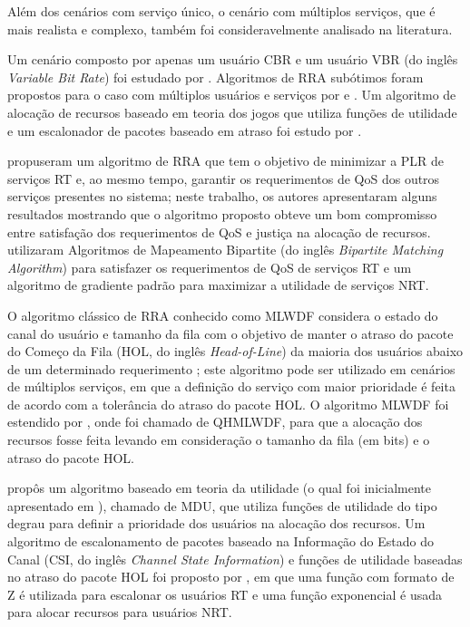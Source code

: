 Além dos cenários com serviço único, o cenário com múltiplos serviços, que é mais realista e complexo, também foi consideravelmente analisado na literatura. 

Um cenário composto por apenas um usuário CBR e um usuário VBR (do inglês \textit{Variable Bit Rate}) foi estudado por . Algoritmos de RRA subótimos foram propostos para o caso com múltiplos usuários e serviços por  e . Um algoritmo de alocação de recursos baseado em teoria dos jogos que utiliza funções de utilidade e um escalonador de pacotes baseado em atraso foi estudo por .

 propuseram um algoritmo de RRA que tem o objetivo de minimizar a PLR de serviços RT e, ao mesmo tempo, garantir os requerimentos de QoS dos outros serviços presentes no sistema; neste trabalho, os autores apresentaram alguns resultados mostrando que o algoritmo proposto obteve um bom compromisso entre satisfação dos requerimentos de QoS e justiça na alocação de recursos.  utilizaram Algoritmos de Mapeamento Bipartite (do inglês \textit{Bipartite Matching Algorithm}) para satisfazer os requerimentos de QoS de serviços RT e um algoritmo de gradiente padrão para maximizar a utilidade de serviços NRT. 

O algoritmo clássico de RRA conhecido como \ac{MLWDF} considera o estado do canal do usuário e tamanho da fila com o objetivo de manter o atraso do pacote do Começo da Fila (HOL, do inglês \textit{Head-of-Line}) da maioria dos usuários abaixo de um determinado requerimento \cite{Art:Andrews2001}; este algoritmo pode ser utilizado em cenários de múltiplos serviços, em que a definição do serviço com maior prioridade é feita de acordo com a tolerância do atraso do pacote HOL. O algoritmo \ac{MLWDF} foi estendido por , onde foi chamado de \ac{QHMLWDF}, para que a alocação dos recursos fosse feita levando em consideração o tamanho da fila (em bits) e o atraso do pacote HOL.

 propôs um algoritmo baseado em teoria da utilidade (o qual foi inicialmente apresentado em ), chamado de \ac{MDU}, que utiliza funções de utilidade do tipo degrau para definir a prioridade dos usuários na alocação dos recursos. Um algoritmo de escalonamento de pacotes baseado na Informação do Estado do Canal (CSI, do inglês \textit{Channel State Information}) e funções de utilidade baseadas no atraso do pacote HOL foi proposto por , em que uma função com formato de Z é utilizada para escalonar os usuários RT e uma função exponencial é usada para alocar recursos para usuários NRT.

